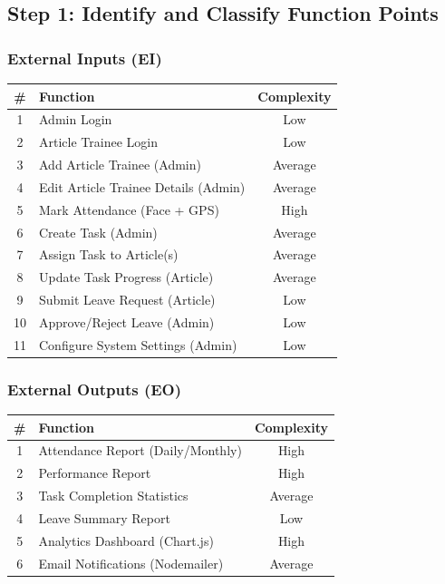 \documentclass[12pt,a4paper]{article}
\begin{document}
\subsection{Step 1: Identify and Classify Function Points}

\subsubsection*{External Inputs (EI)}
\begin{center}
\begin{tabular}{clc}
\toprule
\textbf{\#} & \textbf{Function} & \textbf{Complexity} \\
\midrule
1 & Admin Login & Low \\
2 & Article Trainee Login & Low \\
3 & Add Article Trainee (Admin) & Average \\
4 & Edit Article Trainee Details (Admin) & Average \\
5 & Mark Attendance (Face + GPS) & High \\
6 & Create Task (Admin) & Average \\
7 & Assign Task to Article(s) & Average \\
8 & Update Task Progress (Article) & Average \\
9 & Submit Leave Request (Article) & Low \\
10 & Approve/Reject Leave (Admin) & Low \\
11 & Configure System Settings (Admin) & Low \\
\bottomrule
\end{tabular}
\end{center}

\subsubsection*{External Outputs (EO)}
\begin{center}
\begin{tabular}{clc}
\toprule
\textbf{\#} & \textbf{Function} & \textbf{Complexity} \\
\midrule
1 & Attendance Report (Daily/Monthly) & High \\
2 & Performance Report & High \\
3 & Task Completion Statistics & Average \\
4 & Leave Summary Report & Low \\
5 & Analytics Dashboard (Chart.js) & High \\
6 & Email Notifications (Nodemailer) & Average \\
\bottomrule
\end{tabular}
\end{center}
\end{document}
